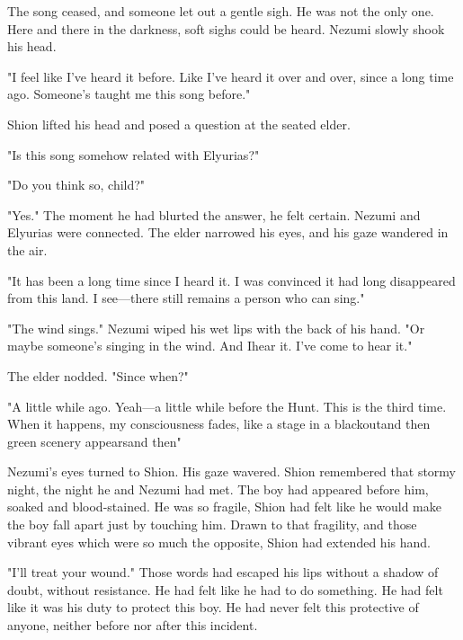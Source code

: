 \clearpage


The song ceased, and someone let out a gentle sigh. He was not the only
one. Here and there in the darkness, soft sighs could be heard. Nezumi
slowly shook his head.

"I feel like I've heard it before. Like I've heard it over and over,
since a long time ago. Someone's taught me this song before."

Shion lifted his head and posed a question at the seated elder.

"Is this song somehow related with Elyurias?"

"Do you think so, child?"

"Yes." The moment he had blurted the answer, he felt certain. Nezumi and
Elyurias were connected. The elder narrowed his eyes, and his gaze
wandered in the air.

"It has been a long time since I heard it. I was convinced it had long
disappeared from this land. I see---there still remains a person who can
sing."

"The wind sings." Nezumi wiped his wet lips with the back of his hand.
"Or maybe someone's singing in the wind. And I\el hear it. I've come to
hear it."

The elder nodded. "Since when?"

"A little while ago. Yeah---a little while before the Hunt. This is the
third time. When it happens, my consciousness fades, like a stage in a
blackout\el and then green scenery appears\el and then\el "

Nezumi's eyes turned to Shion. His gaze wavered. Shion remembered that
stormy night, the night he and Nezumi had met. The boy had appeared
before him, soaked and blood-stained. He was so fragile, Shion had felt
like he would make the boy fall apart just by touching him. Drawn to
that fragility, and those vibrant eyes which were so much the opposite,
Shion had extended his hand.

"I'll treat your wound." Those words had escaped his lips without a
shadow of doubt, without resistance. He had felt like he had to do
something. He had felt like it was his duty to protect this boy. He had
never felt this protective of anyone, neither before nor after this
incident.

